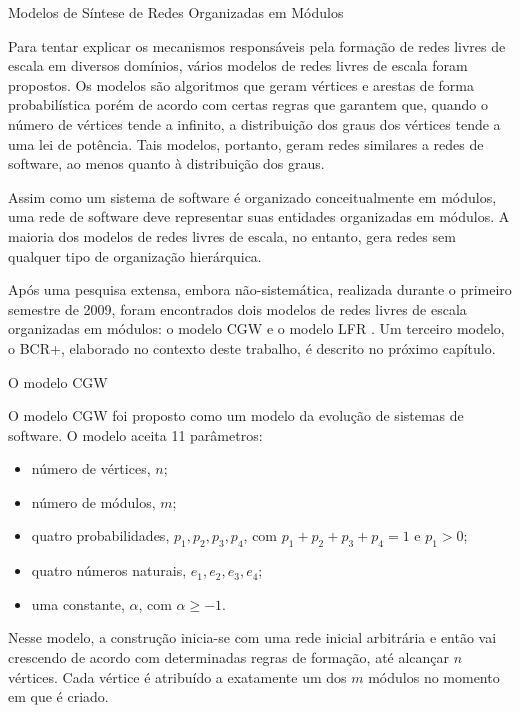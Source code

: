 \begin{section}{Modelos de Síntese de Redes Organizadas em Módulos}

Para tentar explicar os mecanismos responsáveis pela formação de redes livres de escala em diversos domínios, vários modelos de redes livres de escala foram propostos. Os modelos são algoritmos que geram vértices e arestas de forma probabilística porém de acordo com certas regras que garantem que, quando o número de vértices tende a infinito, a distribuição dos graus dos vértices tende a uma lei de potência. Tais modelos, portanto, geram redes similares a redes de software, ao menos quanto à distribuição dos graus.

Assim como um sistema de software é organizado conceitualmente em módulos, uma rede de software deve representar suas entidades organizadas em módulos. A maioria dos modelos de redes livres de escala, no entanto, gera redes sem qualquer tipo de organização hierárquica.

Após uma pesquisa extensa, embora não-sistemática, realizada durante o primeiro semestre de 2009, foram encontrados dois modelos de redes livres de escala organizadas em módulos: o modelo CGW \cite{Chen2008} e o modelo LFR \cite{Lancichinetti2008,Lancichinetti2009}. Um terceiro modelo, o BCR+, elaborado no contexto deste trabalho, é descrito no próximo capítulo.


\begin{subsection}{O modelo CGW}

O modelo CGW \cite{Chen2008} foi proposto como um modelo da evolução de sistemas de software. O modelo aceita 11 parâmetros:

\begin{itemize}
\item número de vértices, $n$;
\item número de módulos, $m$;
\item quatro probabilidades, $p_1, p_2, p_3, p_4$, com $p_1 + p_2 + p_3 + p_4 = 1$ e $p_1 > 0$;
\item quatro números naturais, $e_1, e_2, e_3, e_4$;
\item uma constante, $\alpha$, com $\alpha \ge -1$.
\end{itemize}

Nesse modelo, a construção inicia-se com uma rede inicial arbitrária e então vai crescendo de acordo com determinadas regras de formação, até alcançar $n$ vértices. Cada vértice é atribuído a exatamente um dos $m$ módulos no momento em que é criado.


\end{subsection}
\end{section}
